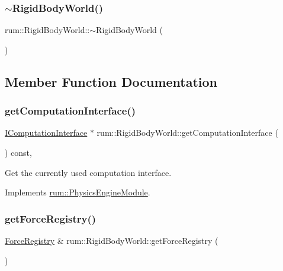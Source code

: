 \subsubsection{\texorpdfstring{$\sim$\+Rigid\+Body\+World()}{~RigidBodyWorld()}}
{\footnotesize\ttfamily rum\+::\+Rigid\+Body\+World\+::$\sim$\+Rigid\+Body\+World (\begin{DoxyParamCaption}{ }\end{DoxyParamCaption})\hspace{0.3cm}{\ttfamily [default]}}



\subsection{Member Function Documentation}
\mbox{\label{classrum_1_1_rigid_body_world_a0ab6763b69b3802d773c68209b0c4c24}} 
\subsubsection{\texorpdfstring{get\+Computation\+Interface()}{getComputationInterface()}}
{\footnotesize\ttfamily \mbox{\hyperlink{classrum_1_1_i_computation_interface}{I\+Computation\+Interface}} $\ast$ rum\+::\+Rigid\+Body\+World\+::get\+Computation\+Interface (\begin{DoxyParamCaption}{ }\end{DoxyParamCaption}) const\hspace{0.3cm}{\ttfamily [override]}, {\ttfamily [virtual]}}

Get the currently used computation interface. 

Implements \mbox{\hyperlink{classrum_1_1_physics_engine_module_ae6046bf333d8ecebf1a2ae4eee4833c1}{rum\+::\+Physics\+Engine\+Module}}.

\mbox{\label{classrum_1_1_rigid_body_world_a86edb6c02c46063029468f33e5ba5ed0}} 
\subsubsection{\texorpdfstring{get\+Force\+Registry()}{getForceRegistry()}\hspace{0.1cm}{\footnotesize\ttfamily [1/2]}}
{\footnotesize\ttfamily \mbox{\hyperlink{classrum_1_1_force_registry}{Force\+Registry}} \& rum\+::\+Rigid\+Body\+World\+::get\+Force\+Registry (\begin{DoxyParamCaption}{ }\end{DoxyParamCaption})}


